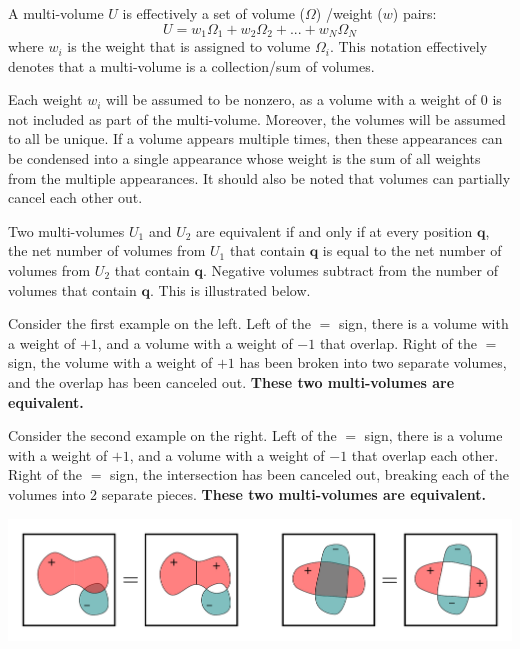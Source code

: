 \vspace{2mm}

A multi-volume \(U\) is effectively a set of volume (\(\Omega\)) /weight (\(w\)) pairs:
\[U = w_1 \Omega_1 + w_2 \Omega_2 + ... + w_N \Omega_N\]
where \(w_i\) is the weight that is assigned to volume \(\Omega_i\). This notation effectively denotes that a multi-volume is a collection/sum of volumes.

Each weight \(w_i\) will be assumed to be nonzero, as a volume with a weight of 0 is not included as part of the multi-volume. Moreover, the volumes will be assumed to all be unique. If a volume appears multiple times, then these appearances can be condensed into a single appearance whose weight is the sum of all weights from the multiple appearances. It should also be noted that volumes can partially cancel each other out.  

Two multi-volumes \(U_1\) and \(U_2\) are equivalent if and only if at every position \(\mathbf{q}\), the net number of volumes from \(U_1\) that contain \(\mathbf{q}\) is equal to the net number of volumes from \(U_2\) that contain \(\mathbf{q}\). Negative volumes subtract from the number of volumes that contain \(\mathbf{q}\). This is illustrated below. 

Consider the first example on the left. Left of the \(=\) sign, there is a volume with a weight of \(+1\), and a volume with a weight of \(-1\) that overlap. Right of the \(=\) sign, the volume with a weight of \(+1\) has been broken into two separate volumes, and the overlap has been canceled out. {\bf These two multi-volumes are equivalent.} 

Consider the second example on the right. Left of the \(=\) sign, there is a volume with a weight of \(+1\), and a volume with a weight of \(-1\) that overlap each other. Right of the \(=\) sign, the intersection has been canceled out, breaking each of the volumes into 2 separate pieces. {\bf These two multi-volumes are equivalent.}  

\begin{center}
\includegraphics[scale = 0.5]{Multi-structures/Multivolumes/multi-volume_decomposition}
\end{center}


